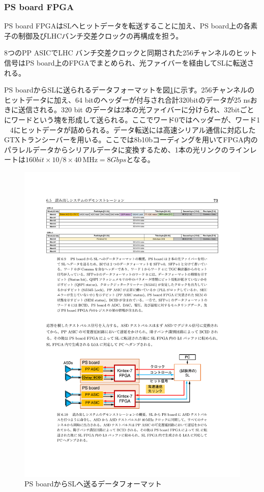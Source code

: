 \subsubsection*{PS board FPGA}
PS board FPGAはSLへヒットデータを転送することに加え、PS board上の各素子の制御及びLHCバンチ交差クロックの再構成を担う。

8つのPP ASICでLHC バンチ交差クロックと同期された256チャンネルのヒット信号はPS board上のFPGAでまとめられ、光ファイバーを経由してSLに転送される。

PS boardからSLに送られるデータフォーマットを図\ref{TGC_PSBuplink}に示す。256チャンネルのヒットデータに加え、64 bitのヘッダーが付与され合計320bitのデータが25 nsおきに送信される。320 bit のデータは2本の光ファイバーに分けられ、32bitごとにワードという塊を形成して送られる。ここでワード0ではヘッダーが、ワード1 ~ 4にヒットデータが詰められる。データ転送には高速シリアル通信に対応したGTXトランシーバーを用いる。ここでは8b10bコーディングを用いてFPGA内のパラレルデータからシリアルデータに変換するため、1本の光リンクのラインレートは$160 bit \times 10/8 \times 40 \mathrm{\,MHz} = 8Gbps$となる。

\begin{figure} 
\centering
\includegraphics[width=16cm]{fig/Intro/TGC_PSBuplink.pdf}
\caption[PS boardからSLへ送るデータフォーマット]{PS boardからSLへ送るデータフォーマット\cite{mt_aoki}}
\label{TGC_PSBuplink}
\end{figure}

